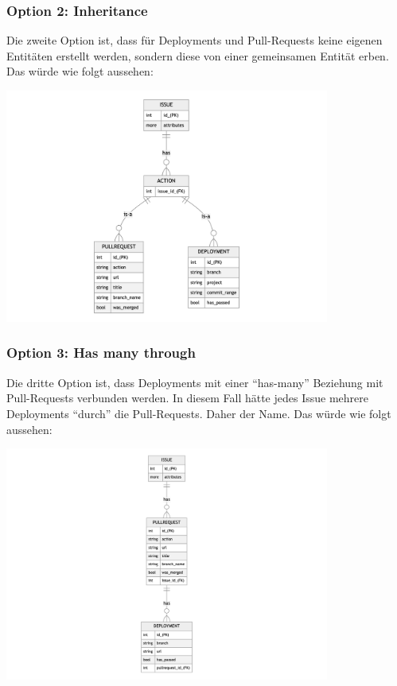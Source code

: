 \begin{minipage}{\textwidth}
  \subsubsection{Option 2: Inheritance}
  Die zweite Option ist, dass für Deployments und Pull-Requests keine eigenen Entitäten erstellt werden, sondern diese von
  einer gemeinsamen Entität erben. Das würde wie folgt aussehen:
  \begin{center}
    \includegraphics[width=0.8\textwidth]{images/erd/inheritance.png}
    \label{fig:erd_inheritance}
  \end{center}
\end{minipage}

\begin{minipage}{\textwidth}
  \subsubsection{Option 3: Has many through}
  Die dritte Option ist, dass Deployments mit einer \enquote{has-many} Beziehung mit Pull-Requests verbunden werden. In diesem Fall hätte jedes
  Issue mehrere Deployments \enquote{durch} die Pull-Requests. Daher der Name. Das würde wie folgt aussehen:
  \begin{center}
    \includegraphics[width=0.8\textwidth]{images/erd/has_many_through.png}
    \label{fig:erd_has_many_through}
  \end{center}
\end{minipage}

